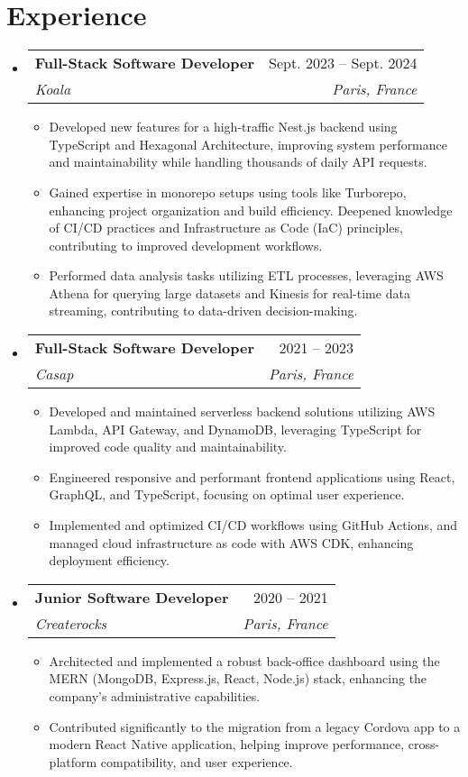 \documentclass[letterpaper,11pt]{article}
\makeatletter
\newcommand{\resumeItem}[1]{
  \item\small{
    {#1 \vspace{-2pt}}
  }
}
\newcommand{\resumeSubheading}[4]{
  \vspace{-2pt}\item
    \begin{tabular*}{0.97\textwidth}[t]{l@{\extracolsep{\fill}}r}
      \textbf{#1} & #2 \\
      \textit{\small#3} & \textit{\small #4} \\
    \end{tabular*}\vspace{-7pt}
}
\newcommand{\resumeSubHeadingListStart}{\begin{itemize}[leftmargin=0.15in, label={}]}
\newcommand{\resumeSubHeadingListEnd}{\end{itemize}}
\newcommand{\resumeItemListStart}{\begin{itemize}}
\newcommand{\resumeItemListEnd}{\end{itemize}\vspace{-5pt}}
\makeatother
\begin{document}
\section{Experience}
  \resumeSubHeadingListStart

    \resumeSubheading
      {Full-Stack Software Developer}{Sept. 2023 -- Sept. 2024}
      {Koala}{Paris, France}
      \resumeItemListStart
        \resumeItem{Developed new features for a high-traffic Nest.js backend using TypeScript and Hexagonal Architecture, improving system performance and maintainability while handling thousands of daily API requests.}
        \resumeItem{Gained expertise in monorepo setups using tools like Turborepo, enhancing project organization and build efficiency. Deepened knowledge of CI/CD practices and Infrastructure as Code (IaC) principles, contributing to improved development workflows.}
        \resumeItem{Performed data analysis tasks utilizing ETL processes, leveraging AWS Athena for querying large datasets and Kinesis for real-time data streaming, contributing to data-driven decision-making.}
      \resumeItemListEnd

    \resumeSubheading
      {Full-Stack Software Developer}{2021 -- 2023}
      {Casap}{Paris, France}
      \resumeItemListStart
      \resumeItem{Developed and maintained serverless backend solutions utilizing AWS Lambda, API Gateway, and DynamoDB, leveraging TypeScript for improved code quality and maintainability.}
      \resumeItem{Engineered responsive and performant frontend applications using React, GraphQL, and TypeScript, focusing on optimal user experience.}
      \resumeItem{Implemented and optimized CI/CD workflows using GitHub Actions, and managed cloud infrastructure as code with AWS CDK, enhancing deployment efficiency.}
    \resumeItemListEnd

    \resumeSubheading
      {Junior Software Developer}{2020 -- 2021}
      {Createrocks}{Paris, France}
      \resumeItemListStart
        \resumeItem{Architected and implemented a robust back-office dashboard using the MERN (MongoDB, Express.js, React, Node.js) stack, enhancing the company's administrative capabilities.}
        \resumeItem{Contributed significantly to the migration from a legacy Cordova app to a modern React Native application, helping improve performance, cross-platform compatibility, and user experience.}
      \resumeItemListEnd

  \resumeSubHeadingListEnd

\end{document}
